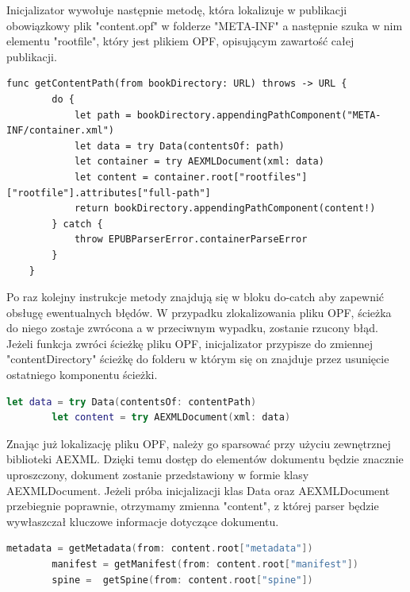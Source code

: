 Inicjalizator wywołuje następnie metodę, która lokalizuje w publikacji obowiązkowy plik "content.opf" w folderze "META-INF" a następnie szuka w nim elementu "rootfile", który jest plikiem OPF, opisującym zawartość całej publikacji.

\begin{lstlisting}[caption={Implementacja metody getContentPath(from bookDirectory:).},language=swift-reference]
    func getContentPath(from bookDirectory: URL) throws -> URL {
        do {
            let path = bookDirectory.appendingPathComponent("META-INF/container.xml")
            let data = try Data(contentsOf: path)
            let container = try AEXMLDocument(xml: data)
            let content = container.root["rootfiles"]["rootfile"].attributes["full-path"]
            return bookDirectory.appendingPathComponent(content!)
        } catch {
            throw EPUBParserError.containerParseError
        }
    }
\end{lstlisting}

Po raz kolejny instrukcje metody znajdują się w bloku do-catch aby zapewnić obsługę ewentualnych błędów. W przypadku zlokalizowania pliku OPF, ścieżka do niego zostaje zwrócona a w przeciwnym wypadku, zostanie rzucony błąd. Jeżeli funkcja zwróci ścieżkę pliku OPF, inicjalizator przypisze do zmiennej "contentDirectory" ścieżkę do folderu w którym się on znajduje przez usunięcie ostatniego komponentu ścieżki.

\begin{lstlisting}[firstnumber=14, language=swift]
        let data = try Data(contentsOf: contentPath)
        let content = try AEXMLDocument(xml: data)
\end{lstlisting}

Znając już lokalizację pliku OPF, należy go sparsować przy użyciu zewnętrznej biblioteki AEXML. Dzięki temu dostęp do elementów dokumentu będzie znacznie uproszczony, dokument zostanie przedstawiony w formie klasy AEXMLDocument. Jeżeli próba inicjalizacji klas Data oraz AEXMLDocument przebiegnie poprawnie, otrzymamy zmienna "content", z której parser będzie wywłaszczał kluczowe informacje dotyczące dokumentu.

\begin{lstlisting}[firstnumber=16, language=swift]
        metadata = getMetadata(from: content.root["metadata"])
        manifest = getManifest(from: content.root["manifest"])
        spine =  getSpine(from: content.root["spine"])
\end{lstlisting}


